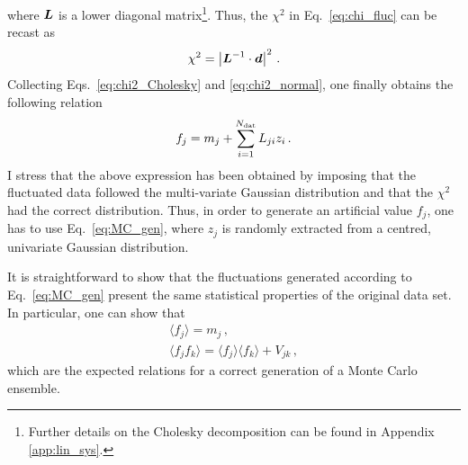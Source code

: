 where $\vb*{L}$ is a lower diagonal matrix\footnote{Further details on the Cholesky decomposition can be found in Appendix \ref{app:lin_sys}.}. Thus, the $\chi^2$ in Eq.~\eqref{eq:chi_fluc} can be recast as
\begin{equation}
  \chi^2 = \left| \vb*{L}^{-1} \cdot \vb*{d} \right|^2 \,.
  \label{eq:chi2_Cholesky}
\end{equation}
Collecting Eqs.~\eqref{eq:chi2_Cholesky} and \eqref{eq:chi2_normal}, one finally obtains the following relation
\begin{equation}
  f_j = m_j + \sum_{i=1}^{N_{\textrm{dat}}} L_{ji} z_i\,.
  \label{eq:MC_gen}
\end{equation}
I stress that the above expression has been obtained by imposing that the fluctuated data followed the multi-variate Gaussian distribution and that the $\chi^2$ had the correct distribution. Thus, in order to generate an artificial value $f_j$, one has to use Eq.~\eqref{eq:MC_gen}, where $z_j$ is randomly extracted from a centred, univariate Gaussian distribution.\par
It is straightforward to show that the fluctuations generated according to Eq.~\eqref{eq:MC_gen} present the same statistical properties of the original data set. In particular, one can show that
\begin{gather}
  \langle f_j \rangle = m_j \,,\\
  \langle f_j f_k \rangle = \langle f_j \rangle \langle f_k \rangle + V_{jk} \,,
\end{gather}
which are the expected relations for a correct generation of a Monte Carlo ensemble.

